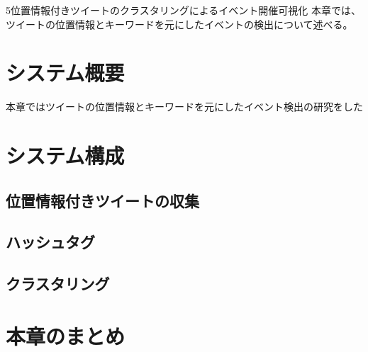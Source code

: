 \chapterhead
{5}{位置情報付きツイートのクラスタリングによるイベント開催可視化}
{本章では、ツイートの位置情報とキーワードを元にしたイベントの検出について述べる。}


\section{システム概要}
本章ではツイートの位置情報とキーワードを元にしたイベント検出の研究をした

\section{システム構成}
\subsection{位置情報付きツイートの収集}
\subsection{ハッシュタグ}
\subsection{クラスタリング}

\newpage

\section{本章のまとめ}

\newpage
